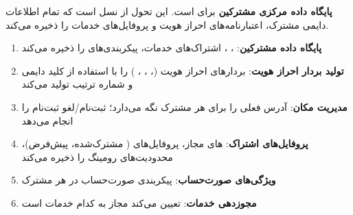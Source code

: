 

\CNchained{}

 \textbf{پایگاه داده مرکزی مشترکین} برای  است. این تحول  از نسل  است که تمام اطلاعات دایمی مشترک، اعتبارنامه‌های احراز هویت و پروفایل‌های خدمات را ذخیره می‌کند.


\begin{enumerate}
\def\labelenumi{\arabic{enumi}.}
\tightlist
\item
  \textbf{پایگاه داده مشترکین}: ، ، اشتراک‌های خدمات، پیکربندی‌های  را ذخیره می‌کند
\item
  \textbf{تولید بردار احراز هویت}: بردارهای احراز هویت  (، ، ، ) را با استفاده از کلید دایمی  و شماره ترتیب  تولید می‌کند
\item
  \textbf{مدیریت مکان}: آدرس  فعلی را برای هر مشترک نگه می‌دارد؛ ثبت‌نام/\allowbreak{}لغو ثبت‌نام را انجام می‌دهد
\item
  \textbf{پروفایل‌های اشتراک}: های مجاز، پروفایل‌های  ( مشترک‌شده،  پیش‌فرض)، محدودیت‌های رومینگ را ذخیره می‌کند
\item
  \textbf{ویژگی‌های صورت‌حساب}: پیکربندی صورت‌حساب در هر مشترک
\item
  \textbf{مجوزدهی خدمات}: تعیین می‌کند  مجاز به کدام خدمات است
\end{enumerate}



